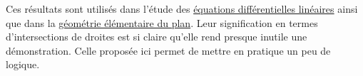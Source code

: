 Ces résultats sont utilisés dans l'étude des \href{\baseurl C1616.pdf}{équations différentielles linéaires} ainsi que dans la \href{\baseurl C2005.pdf}{géométrie élémentaire du plan}. Leur signification en termes d'intersections de droites est si claire qu'elle rend presque inutile une démonstration. Celle proposée ici permet de mettre en pratique un peu de logique.


